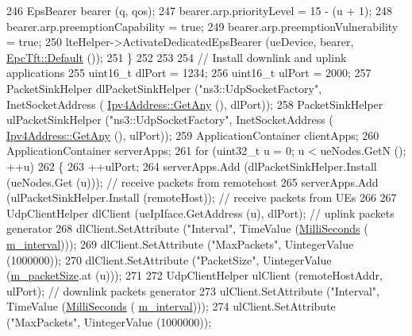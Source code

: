 \begin{DoxyCode}
246       EpsBearer bearer (q, qos);
247       bearer.arp.priorityLevel = 15 - (u + 1);
248       bearer.arp.preemptionCapability = \textcolor{keyword}{true};
249       bearer.arp.preemptionVulnerability = \textcolor{keyword}{true};
250       lteHelper->ActivateDedicatedEpsBearer (ueDevice, bearer, \hyperlink{classns3_1_1EpcTft_a48c099da249ba99152c2e597c864e155}{EpcTft::Default} ());
251     \}
252 
253 
254   \textcolor{comment}{// Install downlink and uplink applications}
255   uint16\_t dlPort = 1234;
256   uint16\_t ulPort = 2000;
257   PacketSinkHelper dlPacketSinkHelper (\textcolor{stringliteral}{"ns3::UdpSocketFactory"}, InetSocketAddress (
      \hyperlink{classns3_1_1Ipv4Address_a7a39b330c8e701183a411d5779fca1a4}{Ipv4Address::GetAny} (), dlPort));
258   PacketSinkHelper ulPacketSinkHelper (\textcolor{stringliteral}{"ns3::UdpSocketFactory"}, InetSocketAddress (
      \hyperlink{classns3_1_1Ipv4Address_a7a39b330c8e701183a411d5779fca1a4}{Ipv4Address::GetAny} (), ulPort));
259   ApplicationContainer clientApps;
260   ApplicationContainer serverApps;
261   \textcolor{keywordflow}{for} (uint32\_t u = 0; u < ueNodes.GetN (); ++u)
262     \{
263       ++ulPort;
264       serverApps.Add (dlPacketSinkHelper.Install (ueNodes.Get (u))); \textcolor{comment}{// receive packets from remotehost}
265       serverApps.Add (ulPacketSinkHelper.Install (remoteHost));  \textcolor{comment}{// receive packets from UEs}
266 
267       UdpClientHelper dlClient (ueIpIface.GetAddress (u), dlPort); \textcolor{comment}{// uplink packets generator}
268       dlClient.SetAttribute (\textcolor{stringliteral}{"Interval"}, TimeValue (\hyperlink{group__timecivil_gaf26127cf4571146b83a92ee18679c7a9}{MilliSeconds} (
      \hyperlink{classns3_1_1LenaDeactivateBearerTestCase_a9e0c220c5ffe150a033cff11146c620a}{m\_interval})));
269       dlClient.SetAttribute (\textcolor{stringliteral}{"MaxPackets"}, UintegerValue (1000000));
270       dlClient.SetAttribute (\textcolor{stringliteral}{"PacketSize"}, UintegerValue (\hyperlink{classns3_1_1LenaDeactivateBearerTestCase_a0d6c5b51de98a92178ecaa55b4bfc9df}{m\_packetSize}.at (u)));
271 
272       UdpClientHelper ulClient (remoteHostAddr, ulPort);           \textcolor{comment}{// downlink packets generator}
273       ulClient.SetAttribute (\textcolor{stringliteral}{"Interval"}, TimeValue (\hyperlink{group__timecivil_gaf26127cf4571146b83a92ee18679c7a9}{MilliSeconds} (
      \hyperlink{classns3_1_1LenaDeactivateBearerTestCase_a9e0c220c5ffe150a033cff11146c620a}{m\_interval})));
274       ulClient.SetAttribute (\textcolor{stringliteral}{"MaxPackets"}, UintegerValue (1000000));

\end{DoxyCode}
